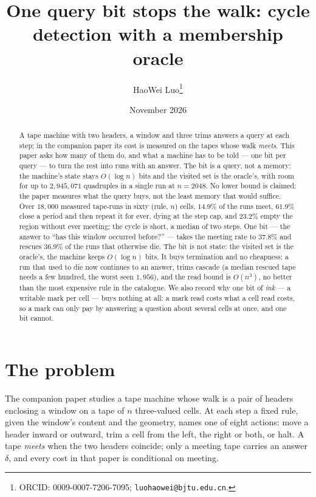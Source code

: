\documentclass[11pt]{article}
\title{One query bit stops the walk: cycle detection with a membership oracle}
\author{HaoWei Luo\thanks{ORCID: 0009-0007-7206-7095; \texttt{luohaowei@bjtu.edu.cn}.}}
\date{November 2026}
\theoremstyle{remark}
\begin{document}
\maketitle

\begin{abstract}
A tape machine with two headers, a window and three trims answers a query at each step; in the companion
paper its cost is measured on the tapes whose walk \emph{meets}. This paper asks how many of them do, and
what a machine has to be told --- one bit per query --- to turn the rest into runs with an answer. The bit is a query, not a memory: the machine's state stays $O(\log n)$ bits and the visited set is the oracle's, with room for up to $2{,}945{,}071$ quadruples in a single run at $n=2048$. No lower bound is claimed: the paper measures what the query buys, not the least memory that would suffice. Over $18{,}000$ measured
tape-runs in sixty (rule, $n$) cells, $14.9\%$ of the runs meet, $61.9\%$ close a period and then repeat it for ever, dying at the step cap, and $23.2\%$ empty the region without ever meeting; the cycle is short, a median of two steps. One bit --- the answer to ``has this
window occurred before?'' --- takes the meeting rate to $37.8\%$ and rescues $36.9\%$ of the runs that
otherwise die. The bit is not state: the visited set is the oracle's, the machine keeps $O(\log n)$ bits.
It buys termination and no cheapness: a run that used to die now continues to an answer, trims cascade (a
median rescued tape needs a few hundred, the worst seen $1{,}956$), and the read bound is
$O(n^{3})$, no better than the most expensive rule in the catalogue. We also record why one bit of \emph{ink} --- a writable
mark per cell --- buys nothing at all: a mark read costs what a cell read costs, so a mark can only pay by
answering a question about several cells at once, and one bit cannot.
\end{abstract}

\section{The problem}

The companion paper \citep{luo-bthm-v2} studies a tape machine whose walk is a pair of headers enclosing a
window on a tape of $n$ three-valued cells. At each step a fixed rule, given the window's content and the
geometry, names one of eight actions: move a header inward or outward, trim a cell from the left, the right
or both, or halt. A tape \emph{meets} when the two headers coincide; only a meeting tape carries an answer
$\delta$, and every cost in that paper is conditional on meeting.
\end{document}
